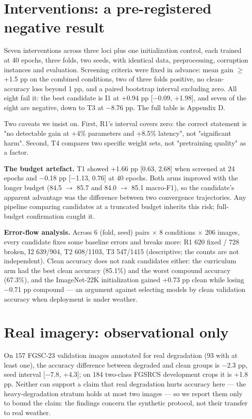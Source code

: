 \section{Interventions: a pre-registered negative result}
Seven interventions across three loci plus one initialization control, each trained at 40 epochs, three folds, two seeds, with identical data, preprocessing, corruption instances and evaluation. Screening criteria were fixed in advance: mean gain $\geq$ +1.5 pp on the combined conditions, two of three folds positive, no clean-accuracy loss beyond 1 pp, and a paired bootstrap interval excluding zero. All eight fail it: the best candidate is I1 at +0.94 pp [$-$0.09, +1.98], and seven of the eight are negative, down to T3 at $-$8.76 pp. The full table is Appendix D.

Two caveats we insist on. First, R1's interval covers zero: the correct statement is "no detectable gain at +4\% parameters and +8.5\% latency", not "significant harm". Second, T4 compares two specific weight sets, not "pretraining quality" as a factor.

\textbf{The budget artefact.} T1 showed +1.66 pp [0.63, 2.68] when screened at 24 epochs and $-$0.18 pp [$-$1.13, 0.76] at 40 epochs. Both arms improved with the longer budget (84.5 $\to$ 85.7 and 84.0 $\to$ 85.1 macro-F1), so the candidate's apparent advantage was the difference between two convergence trajectories. Any pipeline comparing candidates at a truncated budget inherits this risk; full-budget confirmation caught it.

\textbf{Error-flow analysis.} Across 6 (fold, seed) pairs $\times$ 8 conditions $\times$ 206 images, every candidate fixes some baseline errors and breaks more: R1 620 fixed / 728 broken, I2 639/904, T2 608/1103, T3 547/1415 (descriptive; the counts are not independent). Clean accuracy does not rank candidates either: the curriculum arm had the best clean accuracy (85.1\%) and the worst compound accuracy (67.3\%), and the ImageNet-22K initialization gained +0.73 pp clean while losing $-$0.71 pp compound --- an argument against selecting models by clean validation accuracy when deployment is under weather.

\section{Real imagery: observational only}
On 157 FGSC-23 validation images annotated for real degradation (93 with at least one), the accuracy difference between degraded and clean groups is $-$2.3 pp, seed interval [$-$7.8, +4.3]; on 184 two-class FGSRCS development crops it is +1.8 pp. Neither can support a claim that real degradation hurts accuracy here --- the heavy-degradation stratum holds at most two images --- so we report them only to bound the claim: the findings concern the synthetic protocol, not their transfer to real weather.

